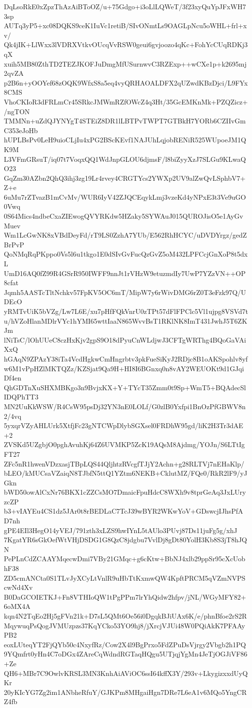 DqLsoRkE0xZpzThAzAiBToOZ/u+75Gdgo+i3oLlLQWeT/3f23xyQuYpJFxWH73sp
AUTq3yP5+xc08DQKS9ceK1IuVc1retiB/SIvONmtLs9OAGLpNcu5oWHL+frl+xv/
Qk4jIK+LlWxx3lVDRXVtkvOUcqVvRSW0geui6gvjoozo4qKc+FohYcCUqRDKj3qX
xuih5MB80ZthTD2TEZJKOFJuDmgMfUSurnwvC3RZExp++wCXe1p+k2695mj2qvZA
p2B6n+yOOYef68zOQK9WfxS8a5eq4vyQRHAOALDFX2qUZwdKBzDjci/L9FYx8CMS
VhoCKIoR3dFRLmCr45SRkcJMWmRZfOWcZ4q3Ht/35GcEMKnMk+PZQZicz+/ngTON
TMMNn+uZdQJYNYgT4STEiZ8DR1lLBTPvTWPT7GTBkH7YORb6CZIIvGmC353eJoHb
hUPLBsPv0LeH9uioCLjIu4xPG2BScKEvf1NAJUhLqjobRENiR525WUpoeJM1QK9M
L3VFmGRsuT/iq07t7VoqxQQ1WdJnpGLOU6djmsF/l8biZyyXzJ7SLGu9KLwaQO23
GqZm30AZbn2QhQ3ihj3zg19Lr4rvey4CRGTYcs2YWXp2UV9alZwQvLSphbV7+Z+e
6uMu7rZTvazB1mCvMv/WUR6IyV42ZJQCEqykLmj3vzeKd4yNPxE3t3Ve9uGO0Vwq
0S64Mics4ndbeCxaZIEwogQVYRKdw5HZaky5SYWAuJ015QUROJisO5e1AyGvMuev
Wm1LcGwNK8xVBdDeyFd/rT9LS0ZzhA7YUb/E562RhHCYC/uDVDYrgz/gedZBrPvP
QoNMqRqPKppo0Vs5l6u1tkgo1E0dSIvGvFucQzGvZ5oM432LPFCcjGnXoP8t5dxL
UmD16AQ0fZ99R4GSrR950IWFF9nnJt1rVHzW9etuzmdIy7UwP7YZzVN++OP8cfat
Jqmh5AASTcTltNchkv57FpKV5OC6mT/MipW7y6rWivDMG6rZ0T3eFzk97Q/UDEcO
yRMTvUiK5bVZg/Lw7L6E/xu7pHfFQkVnrU0zTPt57dFlFPClc5Vl1ujpg8VSVd7t
u/hVZoHlanMDlrVYc1hYMI65wttIaaN865WvvBsT1RKlNK8ImT431JwhJ5T6ZKJm
lNiTsC/lOhUUeC8czHxKjv2gpS9O18dPyuCnWLdjwJ3CFTgWRThg4BQoGaVAiXxQ
hGAqN9ZPAzY38iTa4VcdHgkwCmHngrbtv3pkFueSiKyJ2RDjc8B1oAKSpohlv8yf
w6M1vPpHZlMKTQZz/KZSjat9Qa9H+HI8I6BGnxq0n8vAY2WEUOKt9d1GJqiDf4en
QhGDTnXuSHXMBKgo3n9BvjxKX+Y+TYcT35Zmm0t9Sp+WmT5+BQAdecSlIDQPhTT3
MN2UuKkWSW/R4CsW95psDj32YN3nE0LOLf/G0zlB0Yxfpi1BnOzPfGBWV8n2/4vq
5yxqrVZyAHLUrk5XtfjFc23gNTCWpDlybSGXsel0FRDhW95gd/liK2H3Tr3dAE+2
ZVSKd5UZgbjO0pghAvuhKj64Z6UVMKP5ZcK19AQsM8Ajdmg/YOJn/S6LTtIgFT27
ZFc5nR1hwenVDzxasjTBpLQS44QljhtzRVcgfTJjY2Achn+g28RLTVj7nEHaKlp/
bLEO/kMUCsaVZaiqN8TJbfN5ttQ1YZtm6NEKB+CklutMZ/FQe0/RkR2lF9/yJGkn
bWD50owAlCxNr76BKX1cZZCsMO7DmaicFpuHdcC8WXh9v8tprGeAq3JxLUryzcZP
b3+vIAYEu4CS1dz5JAr0t8rBEDLaC7TcJ39wBYR2WKwYoV+GDswcjIJhsPfAD7nh
gPE4EIl3HegO14yVEJ/791zth3xLZS9hwIYnL5tAUlo3PUvj87Ds11juFg5g/xhJ
7KgatYR6sGkOefWtVHjDSDG1G8QzC8jdgbu7VvlDj8gDt80YolH3Kb8S3jT8hJQN
PePLnCdZCAAYMqecwDmi7VBy21GMqc+g6cKtw+BbNJ4xlb29ppSr95cXcUobhF38
ZD5cmANCta0S1TLvJyXCyLtVnlR9uHbTtKxmwQW4KpftPRCM5qVZmNVPScwNd4Xv
B0DaGCOIETKJ+Fn8VTHIoQW1tPgPPm7lrYhQidw2hfpv/jNL/WGyMFY82+6oMX4A
kqn4N2TqEo2Hj5gFVn21k+D7sL5QMt6Oe56i0DgqkBJiUAx6K/e/phnBfoe2rS2R
MqywuqPsQogJVMUzpzs37KqYCko53YO9hj8/jXrcjVJUi48W0PQiAkK7PFAAyPB2
eoxLUteqYT2FjQYb50c4NxyfRz/Cow2X4l9BgPrxo5FdZPuDsVjrgy2Vbgb2h1PQ
9YQmfrt0yHn4C7oDGx4ZAreCqWdndRGTaqHQgu5UTjqjYgMn4JeTjOGJiVF86+Ze
QH6+MBr7C9OwlvKRSL3MN3KnhAiAViOC6ssI64kffX3Y/293v+LkygizxxdUyQKr
20yKIcYG7Zg2im1ANbheRfuY/GJKPm8MHgaiHgn7DRe7L6eA1v6MQo5YngCRZ4fb
